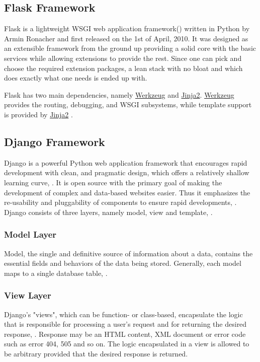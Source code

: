 \subsection{Flask Framework}
Flask is a lightweight \ac{WSGI} web application framework(\citet{Ronacher:2010}) written in Python by Armin Ronacher and first released on the 1st of April, 2010.  It was designed as an extensible framework from the ground up providing a solid core with the basic services while allowing extensions to provide the rest. Since one can pick and choose the required
extension packages, a lean stack with no bloat and which
does exactly what one needs is ended up with.


Flask has two main dependencies, namely \href{http://werkzeug.pocoo.org/}{Werkzeug} and \href{http://jinja.pocoo.org/}{Jinja2}. \href{http://werkzeug.pocoo.org/}{Werkzeug} provides the routing, debugging, and \ac{WSGI} subsystems, while template support is provided by \href{http://jinja.pocoo.org/}{Jinja2} \citet{Grinberg:2014}.
\subsection{Django Framework}
Django is a powerful Python web application framework that encourages rapid development with clean, and pragmatic design, which offers a relatively shallow learning curve, \citet{Antonio:2018}. It is open source with the primary goal of making the development of complex and data-based websites easier. Thus it emphasizes the re-usability and pluggability of components to ensure rapid developments, \citet{Zhou:2010}. Django consists of three layers, namely model, view and template, \citet{Adrian:2019}.
\subsubsection{Model Layer}
Model, the single and definitive source of information about a data, contains the essential fields and behaviors of the data being stored. Generally, each model maps to a single database table, \citet{Adrian:2019}.
\subsubsection{View Layer}
Django's "views", which can be function- or class-based, encapsulate the logic that is responsible for processing a user’s request and for returning the desired response, \citet{Adrian:2019}. Response may be an \ac{HTML} content, \ac{XML} document or error code such as error 404, 505 and so on. The logic encapsulated in a view is allowed to be arbitrary provided that the desired response is returned.
